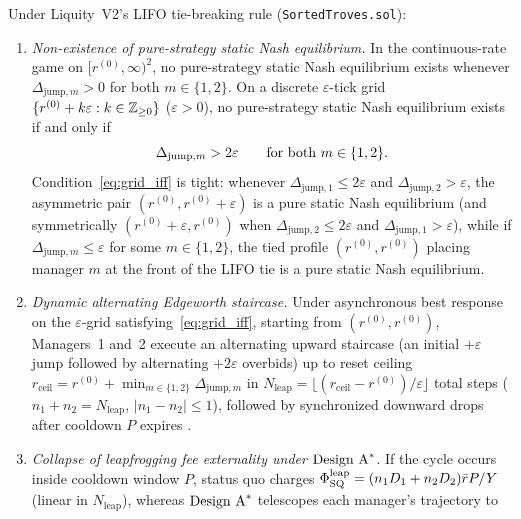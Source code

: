 \begin{theorem}\label{thm:leapfrog}
Under Liquity~V2's LIFO tie-breaking rule (\texttt{SortedTroves.sol}):
\begin{enumerate}[label=(\roman*), leftmargin=2.2em, itemsep=2pt]
\item \emph{Non-existence of pure-strategy static Nash equilibrium.} In the continuous-rate game on $[r^{(0)}, \infty)^2$, no pure-strategy static Nash equilibrium exists whenever $\Delta_{\mathrm{jump}, m} > 0$ for both $m \in \{1, 2\}$. On a discrete $\varepsilon$-tick grid $\{r^{(0)} + k\varepsilon : k \in \mathbb{Z}_{\ge 0}\}$ ($\varepsilon > 0$), no pure-strategy static Nash equilibrium exists if and only if
\begin{equation}\label{eq:grid_iff}
\Delta_{\mathrm{jump}, m} > 2\varepsilon \qquad \textup{for both } m \in \{1, 2\}.
\end{equation}
Condition~\eqref{eq:grid_iff} is tight: whenever $\Delta_{\mathrm{jump}, 1} \le 2\varepsilon$ and $\Delta_{\mathrm{jump}, 2} > \varepsilon$, the asymmetric pair $(r^{(0)}, r^{(0)} + \varepsilon)$ is a pure static Nash equilibrium (and symmetrically $(r^{(0)} + \varepsilon, r^{(0)})$ when $\Delta_{\mathrm{jump}, 2} \le 2\varepsilon$ and $\Delta_{\mathrm{jump}, 1} > \varepsilon$), while if $\Delta_{\mathrm{jump}, m} \le \varepsilon$ for some $m \in \{1, 2\}$, the tied profile $(r^{(0)}, r^{(0)})$ placing manager $m$ at the front of the LIFO tie is a pure static Nash equilibrium.
\item \emph{Dynamic alternating Edgeworth staircase.} Under asynchronous best response on the $\varepsilon$-grid satisfying~\eqref{eq:grid_iff}, starting from $(r^{(0)}, r^{(0)})$, Managers~1 and~2 execute an alternating upward staircase (an initial $+\varepsilon$ jump followed by alternating $+2\varepsilon$ overbids) up to reset ceiling $r_{\mathrm{ceil}} = r^{(0)} + \min_{m \in \{1, 2\}} \Delta_{\mathrm{jump}, m}$ in $N_{\mathrm{leap}} = \lfloor (r_{\mathrm{ceil}} - r^{(0)})/\varepsilon \rfloor$ total steps ($n_1 + n_2 = N_{\mathrm{leap}}$, $|n_1 - n_2| \le 1$), followed by synchronized downward drops after cooldown $P$ expires \citep{maskin1988theory}.
\item \emph{Collapse of leapfrogging fee externality under $\textup{Design A}^*$.} If the cycle occurs inside cooldown window $P$, status quo charges $\Phi_{\mathrm{SQ}}^{\mathrm{leap}} = (n_1 D_1 + n_2 D_2)\bar{r}P/Y$ (linear in $N_{\mathrm{leap}}$), whereas $\textup{Design A}^*$ telescopes each manager's trajectory to

\end{enumerate}
\end{theorem}
